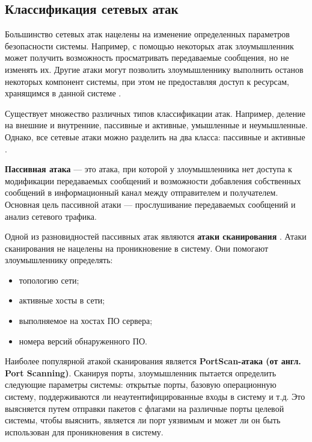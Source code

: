 \clearpage


\subsection{Классификация сетевых атак}

Большинство сетевых атак нацелены на изменение определенных параметров безопасности системы. Например, с помощью некоторых атак злоумышленник может получить возможность просматривать передаваемые сообщения, но не изменять их. Другие атаки могут позволить злоумышленнику выполнить останов некоторых компонент системы, при этом не предоставляя доступ к ресурсам, хранящимся в данной системе \cite{third}.

Существует множество различных типов классификации атак. Например, деление на внешние и внутренние, пассивные и активные, умышленные и неумышленные.
Однако, все сетевые атаки можно разделить на два класса: пассивные и активные \cite{third}.

\textbf{Пассивная атака} \cite{fourth} --- это атака, при которой у злоумышленника нет доступа к модификации передаваемых сообщений и возможности добавления собственных сообщений в информационный канал между отправителем и получателем.
Основная цель пассивной атаки --- прослушивание передаваемых сообщений и анализ сетевого трафика.


Одной из разновидностей пассивных атак являются \textbf{атаки сканирования} \cite{fifth}. 
Атаки сканирования не нацелены на проникновение в систему. Они помогают злоумышленнику определять:

\begin{itemize}
    \item топологию сети;
    \item активные хосты в сети;
	\item выполняемое на хостах ПО сервера;
	\item номера версий обнаруженного ПО.
\end{itemize}

Наиболее популярной атакой сканирования является \textbf{PortScan-атака (от англ. Port Scanning)}. 
Сканируя порты, злоумышленник пытается определить следующие параметры системы: открытые порты, базовую операционную систему,
поддерживаются ли неаутентифицированные входы в систему и т.д. Это выясняется путем отправки пакетов с флагами на
различные порты целевой системы, чтобы выяснить, является ли порт уязвимым и может ли он быть использован для
проникновения в систему.


